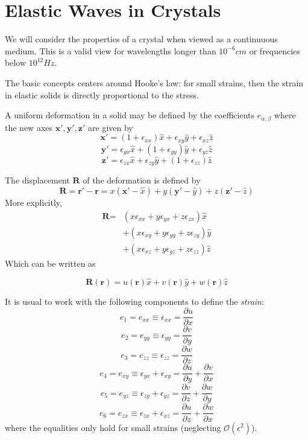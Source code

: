 \documentclass[10pt]{article}
\begin{document}
\section{Elastic Waves in Crystals}
We will consider the properties of a crystal when viewed as a continuuous medium. This is
a valid view for wavelengths longer than $10^{-6} cm$ or frequencies below $10^{12} Hz$.

The basic concepts centers around Hooke's law: for small strains, then the strain in elastic
solids is directly proportional to the stress.

A uniform deformation in a solid may be defined by the coefficients $e_{\alpha, \beta}$ where
the new axes $\textbf{x}', \textbf{y}', \textbf{z}'$ are given by
$$\textbf{x}' = (1+\epsilon_{xx})\hat{x} + \epsilon_{xy}\hat{y} + \epsilon_{xz}\hat{z}$$
$$\textbf{y}' = \epsilon_{yx}\hat{x} + (1+\epsilon_{yy})\hat{y} + \epsilon_{yz}\hat{z}$$
$$\textbf{z}' = \epsilon_{zx}\hat{x} + \epsilon_{zy}\hat{y} + (1+\epsilon_{zz})\hat{z}$$

The displacement $\textbf{R}$ of the deformation is defined by
$$\textbf{R} = \textbf{r}' - \textbf{r} = x(\textbf{x}' - \hat{x}) + y(\textbf{y}' - \hat{y}) +z(\textbf{z}' - \hat{z})$$
More explicitly,
\begin{equation}
\begin{aligned}
  \textbf{R} = & (x\epsilon_{xx} + y\epsilon_{yx} + z\epsilon_{zx})\hat{x} \\
               & + (x\epsilon_{xy} + y\epsilon_{yy} + z\epsilon_{zy})\hat{y} \\
               & + (x\epsilon_{xz} + y\epsilon_{yz} + z\epsilon_{zz})\hat{z}
\end{aligned}
\end{equation}
Which can be written as

$$\textbf{R}(\textbf{r}) = u(\textbf{r})\hat{x} + v(\textbf{r})\hat{y} + w(\textbf{r})\hat{z}$$

It is usual to work with the following components to define the \emph{strain}:
$$e_{1} = e_{xx} \equiv \epsilon_{xx} = \frac{\partial u}{\partial x}$$
$$e_{2} = e_{yy} \equiv \epsilon_{yy} = \frac{\partial v}{\partial y}$$
$$e_{3} = e_{zz} \equiv \epsilon_{zz} = \frac{\partial w}{\partial z}$$
$$e_{4} = e_{xy} \equiv \epsilon_{yx} + \epsilon_{xy} = \frac{\partial u}{\partial y} + \frac{\partial v}{\partial x}$$
$$e_{5} = e_{yz} \equiv \epsilon_{zy} + \epsilon_{yz} = \frac{\partial v}{\partial z} + \frac{\partial w}{\partial y}$$
$$e_{6} = e_{zx} \equiv \epsilon_{zx} + \epsilon_{xz} = \frac{\partial u}{\partial z} + \frac{\partial w}{\partial x}$$
where the equalities only hold for small strains (neglecting $\mathcal{O}(\epsilon^{2})$).
\end{document}
